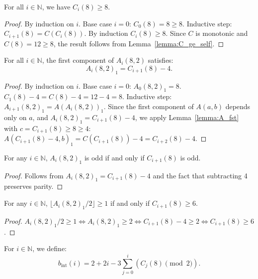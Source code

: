 \begin{lemma}
  \label{lemma:Citer_ge_8}
  \leanok
  For all $i \in \mathbb{N}$, we have $C_i(8) \geq 8$.
  \begin{proof}
    \leanok
    By induction on $i$. Base case $i=0$: $C_0(8) = 8 \geq 8$.
    Inductive step: $C_{i+1}(8) = C(C_i(8))$. By induction $C_i(8) \geq 8$.
    Since $C$ is monotonic and $C(8) = 12 \geq 8$, the result follows from Lemma~\ref{lemma:C_ge_self}.
  \end{proof}
\end{lemma}

\begin{lemma}
  \label{lemma:Aiter_fst_eq}
  \leanok
  For all $i \in \mathbb{N}$, the first component of $A_i(8, 2)$ satisfies:
  \[ A_i(8, 2)_1 = C_{i+1}(8) - 4. \]
  \begin{proof}
    \leanok
    By induction on $i$.
    Base case $i=0$: $A_0(8, 2)_1 = 8$. $C_1(8)-4 = C(8)-4 = 12-4 = 8$.
    Inductive step: $A_{i+1}(8, 2)_1 = A(A_i(8, 2))_1$.
    Since the first component of $A(a, b)$ depends only on $a$, and $A_i(8, 2)_1 = C_{i+1}(8)-4$,
    we apply Lemma~\ref{lemma:A_fst} with $c = C_{i+1}(8) \geq 8 \geq 4$:
    $A(C_{i+1}(8)-4, b)_1 = C(C_{i+1}(8)) - 4 = C_{i+2}(8) - 4$.
  \end{proof}
\end{lemma}

\begin{lemma}
  \label{lemma:Aiter_fst_parity}
  \leanok
  For any $i \in \mathbb{N}$, $A_i(8, 2)_1$ is odd if and only if $C_{i+1}(8)$ is odd.
  \begin{proof}
    \leanok
    Follows from $A_i(8, 2)_1 = C_{i+1}(8) - 4$ and the fact that subtracting 4 preserves parity.
  \end{proof}
\end{lemma}

\begin{lemma}
  \label{lemma:Aiter_fst_div2}
  \leanok
  For any $i \in \mathbb{N}$, $\lfloor A_i(8, 2)_1 / 2 \rfloor \geq 1$ if and only if $C_{i+1}(8) \geq 6$.
  \begin{proof}
    \leanok
    $A_i(8, 2)_1 / 2 \geq 1 \iff A_i(8, 2)_1 \geq 2 \iff C_{i+1}(8) - 4 \geq 2 \iff C_{i+1}(8) \geq 6$.
  \end{proof}
\end{lemma}

\begin{definition}
  \label{def:b_int}
  \leanok
  For $i \in \mathbb{N}$, we define:
  \[ b_{\text{int}}(i) = 2 + 2i - 3 \sum_{j=0}^i (C_j(8) \pmod 2). \]
\end{definition}

